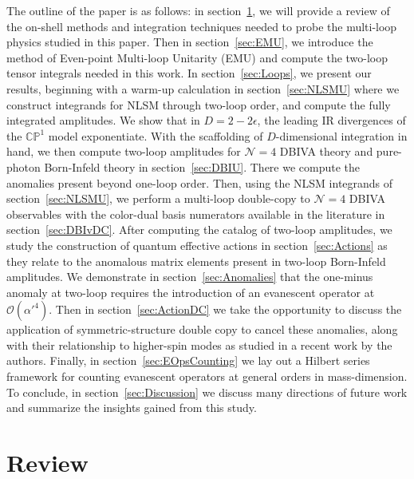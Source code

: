 \documentclass[11pt,letter]{article}
\def\sect#1{section~\ref{#1}}
\begin{document}
The outline of the paper is as follows: in \sect{sec:Review}, we will provide a review of the on-shell methods and integration techniques needed to probe the multi-loop physics studied in this paper. Then in \sect{sec:EMU}, we introduce the method of Even-point Multi-loop Unitarity (EMU) and compute the two-loop tensor integrals needed in this work. In \sect{sec:Loops}, we present our results, beginning with a warm-up calculation in \sect{sec:NLSMU} where we construct integrands for NLSM through two-loop order, and compute the fully integrated amplitudes. We show that in $D=2-2\epsilon$, the leading IR divergences of the $\mathbb{CP}^1$ model exponentiate. With the scaffolding of $D$-dimensional integration in hand, we then compute two-loop amplitudes for $\mathcal{N}=4$ DBIVA theory and pure-photon Born-Infeld theory in \sect{sec:DBIU}. There we compute the anomalies present beyond one-loop order.  Then, using the NLSM integrands of \sect{sec:NLSMU}, we perform a multi-loop double-copy to $\mathcal{N}=4$ DBIVA observables with the color-dual basis numerators available in the literature in \sect{sec:DBIvDC}. After computing the catalog of two-loop amplitudes, we study the construction of quantum effective actions in \sect{sec:Actions} as they relate to the anomalous matrix elements present in two-loop Born-Infeld amplitudes. We demonstrate in \sect{sec:Anomalies} that the one-minus anomaly at two-loop requires the introduction of an evanescent operator at $\mathcal{O}(\alpha'^4)$. Then in \sect{sec:ActionDC} we take the opportunity to discuss the application of symmetric-structure double copy to cancel these anomalies, along with their relationship to higher-spin modes as studied in a recent work by the authors. Finally, in \sect{sec:EOpsCounting} we lay out a Hilbert series framework for counting evanescent operators at general orders in mass-dimension. To conclude, in \sect{sec:Discussion} we discuss many directions of future work and summarize the insights gained from this study. 


\section{Review} 
\label{sec:Review}
\end{document}
